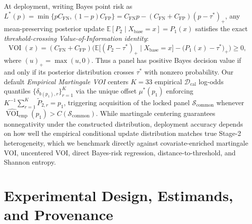 \documentclass[11pt]{article}
\begin{document}
At deployment, writing Bayes point risk as $L^*(p) = \min\{p C_{\text{FN}}, (1-p)C_{\text{FP}}\} = C_{\text{FN}}p - (C_{\text{FN}}+C_{\text{FP}})(p-\tau^*)_+$, any mean-preserving posterior update $\mathbb{E}[P_2 \mid X_{\text{base}}=x] = P_1(x)$ satisfies the exact \emph{threshold-crossing Value-of-Information identity}:
\begin{equation}
  \operatorname{VOI}(x) = (C_{\text{FN}} + C_{\text{FP}})\Big(\mathbb{E}\big[(P_2 - \tau^*)_+ \mid X_{\text{base}}=x\big] - \big(P_1(x) - \tau^*\big)_+\Big) \ge 0,
  \label{eq:voi_crossing}
\end{equation}
where $(u)_+ = \max(u,0)$. Thus a panel has positive Bayes decision value if and only if its posterior distribution crosses $\tau^*$ with nonzero probability. Our default \emph{Empirical Martingale VOI} centers $K=33$ empirical $\mathcal{D}_{\text{cal}}$ log-odds quantiles $\{\delta_{b(p_1),r}\}_{r=1}^K$ via the unique offset $\mu^*(p_1)$ enforcing $K^{-1}\sum_{r=1}^K \tilde{P}_{2,r} = p_1$, triggering acquisition of the locked panel $\mathcal{S}_{\text{common}}$ whenever $\widehat{\operatorname{VOI}}_{\text{emp}}(p_1) > C(\mathcal{S}_{\text{common}})$. While martingale centering guarantees nonnegativity under the constructed distribution, deployment accuracy depends on how well the empirical conditional update distribution matches true Stage-2 heterogeneity, which we benchmark directly against covariate-enriched martingale VOI, uncentered VOI, direct Bayes-risk regression, distance-to-threshold, and Shannon entropy.

\section{Experimental Design, Estimands, and Provenance}
\label{sec:study_design}
\end{document}

